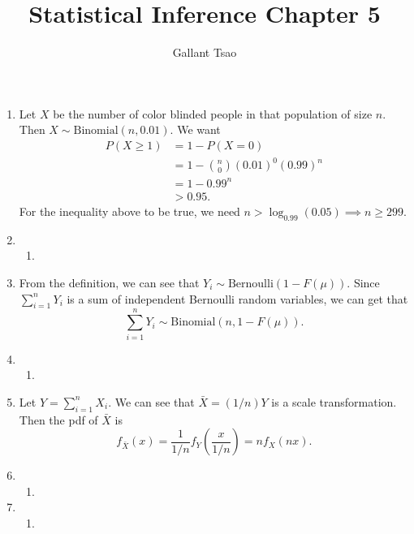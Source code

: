 \documentclass{article}
\title{Statistical Inference Chapter 5}
\author{Gallant Tsao}
\begin{document}
\maketitle

\begin{enumerate}
    \item Let $X$ be the number of color blinded people in that population of size $n$. Then 
    $X \sim \text{Binomial}(n, 0.01)$. We want 
    \begin{align*}
        P(X \geq 1) 
        &= 1 - P(X = 0) \\
        &= 1 - \binom{n}{0}(0.01)^{0}(0.99)^{n} \\
        &= 1 - 0.99^{n} \\
        &> 0.95.
    \end{align*}
    For the inequality above to be true, we need $n > \log_{0.99}(0.05) \implies n \geq 299$.

    \item \begin{enumerate}
        \item 
    \end{enumerate}

    \item From the definition, we can see that $Y_i \sim \text{Bernoulli}(1 - F(\mu))$. 
    Since 
    $\sum_{i = 1}^{n} Y_{i}$ is a sum of independent Bernoulli random variables, we can get 
    that \[ \sum_{i = 1}^{n} Y_{i} \sim \text{Binomial}(n, 1 - F(\mu)). \]

    \item \begin{enumerate}
        \item 
    \end{enumerate}

    \item Let $Y = \sum_{i = 1}^{n} X_i$. We can see that 
    $\bar{X} = (1/n)Y$ is a scale transformation. Then the pdf of $\bar{X}$ is 
    \[ f_{\bar{X}}(x) = \frac{1}{1/n} f_{Y}(\frac{x}{1/n}) = nf_{X}(nx). \]

    \item \begin{enumerate}
        \item 
    \end{enumerate}

    \item \begin{enumerate}
        \item 
    \end{enumerate}
\end{enumerate}
\end{document}
